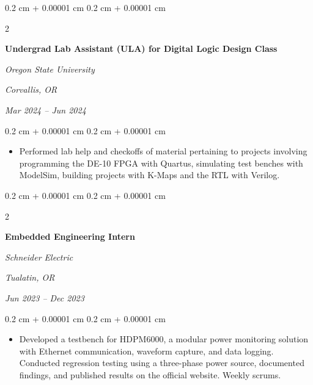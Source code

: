 \documentclass[10pt, letterpaper]{article}
\newenvironment{highlights}{
    \begin{itemize}[
        topsep=0.10 cm,
        parsep=0.10 cm,
        partopsep=0pt,
        itemsep=0pt,
        leftmargin=0.4 cm + 10pt
    ]
}{
    \end{itemize}
} %
\newenvironment{onecolentry}{
    \begin{adjustwidth}{
        0.2 cm + 0.00001 cm
    }{
        0.2 cm + 0.00001 cm
    }
}{
    \end{adjustwidth}
} %
\newenvironment{twocolentry}[2][]{
    \onecolentry
    \def\secondColumn{#2}
    \setcolumnwidth{\fill, 4.5 cm}
    \begin{paracol}{2}
}{
    \switchcolumn \raggedleft \secondColumn
    \end{paracol}
    \endonecolentry
} %
\begin{document}
        \vspace{0.2 cm}

        \begin{twocolentry}{
        \textit{Corvallis, OR}    
            
        \textit{Mar 2024 – Jun 2024}}
            \textbf{Undergrad Lab Assistant (ULA) for Digital Logic Design Class}
            
            \textit{Oregon State University}
        \end{twocolentry}

        \vspace{0.10 cm}
        \begin{onecolentry}
            \begin{highlights}
                \item Performed lab help and checkoffs of material pertaining to projects involving programming the DE-10 FPGA with Quartus, simulating test benches with ModelSim, building projects with K-Maps and the RTL with Verilog.
            \end{highlights}
        \end{onecolentry}
        
        \vspace{0.2 cm}

        \begin{twocolentry}{
        \textit{Tualatin, OR}    
            
        \textit{Jun 2023 – Dec 2023}}
            \textbf{Embedded Engineering Intern}
            
            \textit{Schneider Electric}
        \end{twocolentry}

        \vspace{0.10 cm}
        \begin{onecolentry}
            \begin{highlights} 
                \item Developed a testbench for HDPM6000, a modular power monitoring solution with Ethernet communication, waveform capture, and data logging. Conducted regression testing using a three-phase power source, documented findings, and published results on the official website. Weekly scrums.

            \end{highlights}
        \end{onecolentry}

        \vspace{0.2 cm}
\end{document}
